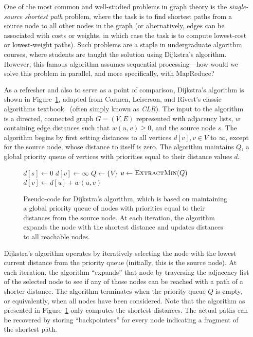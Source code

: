One of the most common and well-studied problems in graph theory is
the \emph{single-source shortest path} problem, where the task is to
find shortest paths from a source node to all other nodes in the graph
(or alternatively, edges can be associated with costs or weights, in
which case the task is to compute lowest-cost or lowest-weight paths).
Such problems are a staple in undergraduate algorithm courses, where
students are taught the solution using Dijkstra's algorithm.  However,
this famous algorithm assumes sequential processing---how would we
solve this problem in parallel, and more specifically, with MapReduce?

As a refresher and also to serve as a point of comparison, Dijkstra's
algorithm is shown in Figure~\ref{figure:chapter-graphs:Dijkstra},
adapted from Cormen, Leiserson, and Rivest's classic algorithms
textbook~\cite{CLR} (often simply known as \emph{CLR}).  The input to
the algorithm is a directed, connected graph $G=(V,E)$ represented
with adjacency lists, $w$ containing edge distances such that $w(u,v)
\geq 0$, and the source node $s$.  The algorithm begins by first
setting distances to all vertices $d[v], v \in V$ to $\infty$, except
for the source node, whose distance to itself is zero.  The algorithm
maintains $Q$, a global priority queue of vertices with priorities equal to
their distance values $d$.

\begin{figure}[t]
\algrenewcommand\algorithmicfunction{}
  \begin{algorithmic}[1]
    \State $d[s] \gets 0$
      \State $d[v] \gets \infty$
    \EndFor
    \State $Q \gets \{V\}$
      \State $u \gets \textsc{ExtractMin}(Q)$
          \State $d[v] \gets d[u] + w(u,v)$
        \EndIf
      \EndFor
    \EndWhile
    \EndFunction
  \end{algorithmic}
  \caption{Pseudo-code for Dijkstra's algorithm, which is based on
    maintaining a global priority queue of nodes with priorities equal to
    their distances from the source node.  At each iteration, the
    algorithm expands the node with the shortest distance and updates
    distances to all reachable nodes.}
\label{figure:chapter-graphs:Dijkstra}
\end{figure}

Dijkstra's algorithm operates by iteratively selecting the node with
the lowest current distance from the priority queue (initially, this
is the source node).  At each iteration, the algorithm ``expands''
that node by traversing the adjacency list of the selected node to see
if any of those nodes can be reached with a path of a shorter
distance.  The algorithm terminates when the priority queue $Q$ is
empty, or equivalently, when all nodes have been considered.  Note
that the algorithm as presented in
Figure~\ref{figure:chapter-graphs:Dijkstra} only computes the shortest
distances.  The actual paths can be recovered by storing
``backpointers'' for every node indicating a fragment of the shortest
path.

